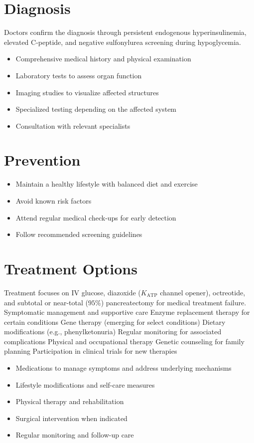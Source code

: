 \section{Diagnosis}
Doctors confirm the diagnosis through persistent endogenous hyperinsulinemia, elevated C-peptide, and negative sulfonylurea screening during hypoglycemia.

\begin{itemize}[noitemsep]
  \item Comprehensive medical history and physical examination
  \item Laboratory tests to assess organ function
  \item Imaging studies to visualize affected structures
  \item Specialized testing depending on the affected system
  \item Consultation with relevant specialists
\end{itemize}
\section{Prevention}
\begin{itemize}[noitemsep]
  \item Maintain a healthy lifestyle with balanced diet and exercise
  \item Avoid known risk factors
  \item Attend regular medical check-ups for early detection
  \item Follow recommended screening guidelines
\end{itemize}
\section{Treatment Options}
Treatment focuses on IV glucose, diazoxide ($K_{\mathrm{ATP}}$ channel opener), octreotide, and subtotal or near-total ($95\%$) pancreatectomy for medical treatment failure. Symptomatic management and supportive care Enzyme replacement therapy for certain conditions Gene therapy (emerging for select conditions) Dietary modifications (e.g., phenylketonuria) Regular monitoring for associated complications Physical and occupational therapy Genetic counseling for family planning Participation in clinical trials for new therapies

\begin{itemize}[noitemsep]
  \item Medications to manage symptoms and address underlying mechanisms
  \item Lifestyle modifications and self-care measures
  \item Physical therapy and rehabilitation
  \item Surgical intervention when indicated
  \item Regular monitoring and follow-up care
\end{itemize}
